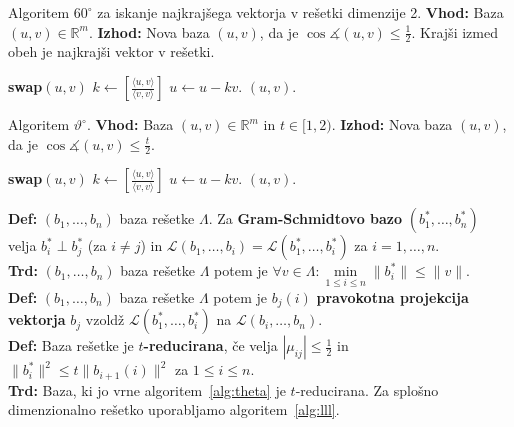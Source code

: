 \documentclass[a4paper,oneside,10pt]{article}
\theoremstyle{definition}
\newcommand{\R}{\ensuremath{\mathbb{R}}}
\newcommand{\LL}{\ensuremath{\mathcal{L}}}
\renewcommand{\theta}{\vartheta}
\let\oldtextbf\textbf
\renewcommand{\textbf}[1]{\oldtextbf{\boldmath #1}}
\begin{document}
\begin{algorithm}[!ht]
\caption{Algoritem $60^\circ$ za iskanje najkrajšega vektorja v rešetki dimenzije 2. \newline
\textbf{Vhod:} Baza $(u, v) \in \R^m$. \newline
\textbf{Izhod:} Nova baza $(u, v)$, da je $\cos\measuredangle(u, v) \leq \frac{1}{2}$. Krajši izmed obeh je najkrajši vektor v rešetki.}
\label{alg:60}
\begin{algorithmic}[1]
\Repeat
\State \textbf{swap}$(u, v)$
\State $k \gets \left[ \frac{\langle u, v \rangle}{\langle v, v \rangle} \right]$
\State $u \gets u - kv$.
\State \Return $(u, v)$.
\EndProcedure
\end{algorithmic}
\end{algorithm}

\begin{algorithm}[!ht]
\caption{Algoritem $\theta^\circ$. \newline
\textbf{Vhod:} Baza $(u, v) \in \R^m$ in $t \in [1, 2)$. \newline
\textbf{Izhod:} Nova baza $(u, v)$, da je $\cos\measuredangle(u, v) \leq \frac{t}{2}$.}
\label{alg:theta}
\begin{algorithmic}[1]
\Repeat
\State \textbf{swap}$(u, v)$
\State $k \gets \left[ \frac{\langle u, v \rangle}{\langle v, v \rangle} \right]$
\State $u \gets u - kv$.
\State \Return $(u, v)$.
\EndProcedure
\end{algorithmic}
\end{algorithm}

\textbf{Def:} $(b_1,\ldots, b_n)$ baza rešetke $\Lambda$. Za \textbf{Gram-Schmidtovo bazo} $(b_1^*, \ldots, b_n^*)$ velja $b_i^* \perp b_j^*$ (za $i \neq j$) in $\LL(b_1, \ldots,b_i) = \LL(b_1^*, \ldots, b_i^*)$ za $i = 1, \ldots, n$. \\
\textbf{Trd:} $(b_1,\ldots, b_n)$ baza rešetke $\Lambda$ potem je $\forall v \in \Lambda \colon \min\limits_{1 \leq i \leq n} \|b_i^*\| \leq \|v\|.$ \\
\textbf{Def:} $(b_1,\ldots, b_n)$ baza rešetke $\Lambda$ potem je $b_j(i)$ \textbf{pravokotna projekcija vektorja} $b_j$ vzoldž $\LL(b_1^*, \ldots, b_i^*)$ na $\LL(b_i, \ldots, b_n)$.\\
\textbf{Def:} Baza rešetke je \textbf{$t$-reducirana}, če velja $|\mu_{ij}| \leq \frac12$ in $\|b_i^\ast\|^2 \leq t \|b_{i+1}(i)\|^2$ za $1 \leq i \leq n$. \\
\textbf{Trd:} Baza, ki jo vrne algoritem~\ref{alg:theta} je $t$-reducirana. Za splošno dimenzionalno rešetko uporabljamo algoritem~\ref{alg:lll}.
\end{document}
